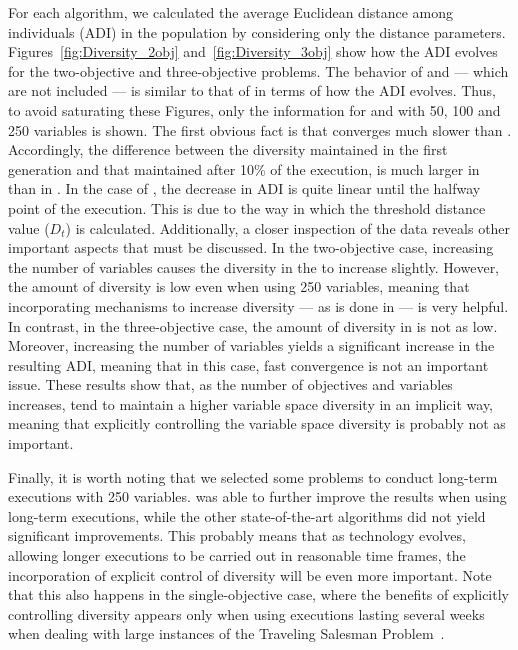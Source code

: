 
For each algorithm, we calculated the average Euclidean distance among individuals (ADI) in the population by considering only 
the distance parameters.
%
Figures~\ref{fig:Diversity_2obj} and~\ref{fig:Diversity_3obj} show how the ADI evolves for the two-objective and three-objective problems.
%
The behavior of \NSGAII{} and \MOEAD{} --- which are not included --- is similar to that of \RMOEA{} in terms of how the ADI evolves. 
%
Thus, to avoid saturating these Figures, only the information for \VSDMOEA{} and \RMOEA{} with 50, 100 and 250 variables is shown.
%
The first obvious fact is that \VSDMOEA{} converges much slower than \RMOEA{}.
%
Accordingly, the difference between the diversity maintained in the first generation and that maintained after 10\% of the execution,
is much larger in \RMOEA{} than in \VSDMOEA{}.
%
In the case of \VSDMOEA{}, the decrease in ADI is quite linear until the halfway point of the execution.
%
This is due to the way in which the threshold distance value ($D_t$) is calculated.
%
Additionally, a closer inspection of the data reveals other important aspects that must be discussed. 
%
In the two-objective case, increasing the number of variables causes the diversity in the \RMOEA{} to increase slightly.
%
However, the amount of diversity is low even when using 250 variables, meaning that incorporating mechanisms to increase diversity --- as is done in \VSDMOEA{} ---
is very helpful.
%
In contrast, in the three-objective case, the amount of diversity in \RMOEA{} is not as low.
%
Moreover, increasing the number of variables yields a significant increase in the resulting ADI, meaning that in this case,
fast convergence is not an important issue.
%
These results show that, as the number of objectives and variables increases, \MOEAS{} tend to maintain a higher variable space diversity
in an implicit way, meaning that explicitly controlling the variable space diversity is probably not as important.
%

Finally, it is worth noting that we selected some problems to conduct long-term executions with 250 variables.
%
\VSDMOEA{} was able to further improve the results when using long-term executions, while the other state-of-the-art algorithms did not yield significant improvements.
%
This probably means that as technology evolves, allowing longer executions to be carried out in reasonable time frames,
the incorporation of explicit control of diversity will be even more important.
%
Note that this also happens in the single-objective case, where the benefits of explicitly controlling diversity appears only when using executions lasting
several weeks when dealing with large instances of the Traveling Salesman Problem~\cite{segura2015novel}.
%

